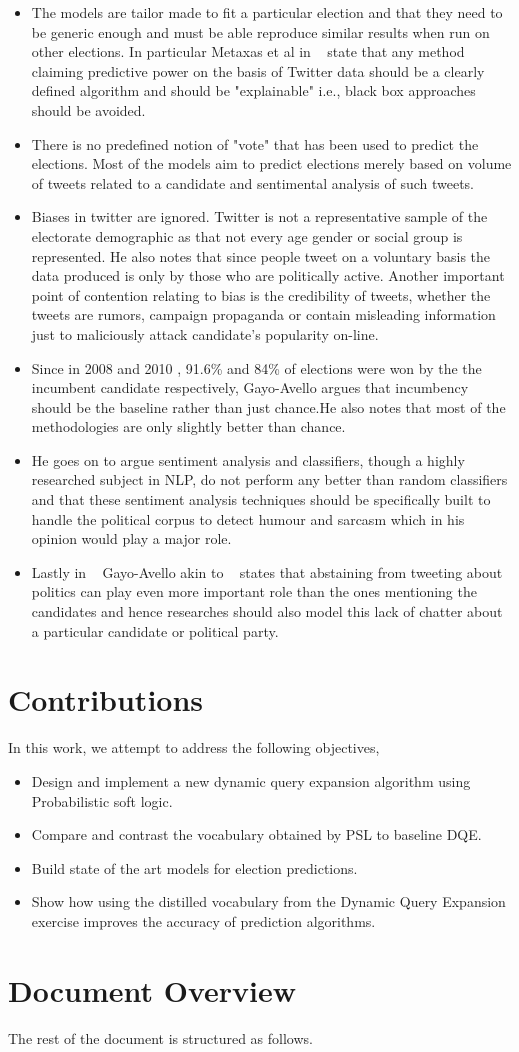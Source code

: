 \begin{itemize}
\item
The models are tailor made to fit a particular election and that they need to be generic enough and must be able reproduce similar results when run on other elections. In particular Metaxas et al in ~\cite{metaxas2011not} state that any method claiming predictive power on the basis of Twitter data should be a clearly defined algorithm and should be "explainable" i.e., black box approaches should be avoided.
\item
There is no predefined notion of "vote" that has been used to predict the elections. Most of the models aim to predict elections merely based on volume of tweets related to a candidate and sentimental analysis of such tweets.
\item
Biases in twitter are ignored. Twitter is not a representative sample of the electorate demographic as that not every age gender or social group is represented. He also notes that since people tweet on a voluntary basis the data produced is only by those who are politically active. Another important point of contention relating to bias is the credibility of tweets, whether the tweets are rumors, campaign propaganda or contain misleading information just to maliciously attack candidate's popularity on-line.
\item
Since in 2008 and 2010 , 91.6\% and 84\% of elections were won by the the incumbent candidate respectively, Gayo-Avello argues that incumbency should be the baseline rather than just chance.He also notes that most of the methodologies are only slightly better than chance.
\item
He goes on to argue sentiment analysis and classifiers, though a highly researched subject in NLP, do not perform any better than random classifiers and that these sentiment analysis techniques should be specifically built to handle the political corpus to detect humour and sarcasm which in his opinion would play a major role.
\item
Lastly in ~\cite{gayo2011don} Gayo-Avello akin to ~\cite{mustafaraj2011vocal} states that abstaining from tweeting about politics can play even more important role than the ones mentioning the candidates and hence researches should also model this lack of chatter about a particular candidate or political party.
\end{itemize}
\section{Contributions}
In this work, we attempt to address the following objectives,
\begin{itemize}
\item
Design and implement a new dynamic query expansion algorithm using Probabilistic soft logic.
\item
Compare and contrast the vocabulary obtained by PSL to baseline DQE.
\item
Build state of the art models for election predictions.
\item
Show how using the distilled vocabulary from the Dynamic Query Expansion exercise improves the accuracy of prediction algorithms.
\end{itemize}

\section{Document Overview}
The rest of the document is structured as follows.